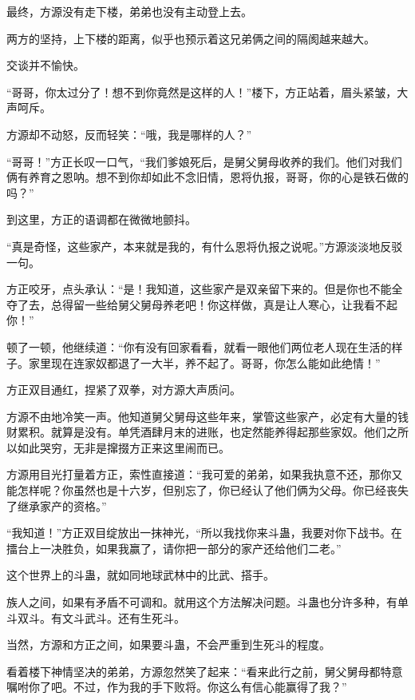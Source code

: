 
\begin{this_body}



最终，方源没有走下楼，弟弟也没有主动登上去。

两方的坚持，上下楼的距离，似乎也预示着这兄弟俩之间的隔阂越来越大。

交谈并不愉快。

“哥哥，你太过分了！想不到你竟然是这样的人！”楼下，方正站着，眉头紧皱，大声呵斥。

方源却不动怒，反而轻笑：“哦，我是哪样的人？”

“哥哥！”方正长叹一口气，“我们爹娘死后，是舅父舅母收养的我们。他们对我们俩有养育之恩呐。想不到你却如此不念旧情，恩将仇报，哥哥，你的心是铁石做的吗？”

到这里，方正的语调都在微微地颤抖。

“真是奇怪，这些家产，本来就是我的，有什么恩将仇报之说呢。”方源淡淡地反驳一句。

方正咬牙，点头承认：“是！我知道，这些家产是双亲留下来的。但是你也不能全夺了去，总得留一些给舅父舅母养老吧！你这样做，真是让人寒心，让我看不起你！”

顿了一顿，他继续道：“你有没有回家看看，就看一眼他们两位老人现在生活的样子。家里现在连家奴都退了一大半，养不起了。哥哥，你怎么能如此绝情！”

方正双目通红，捏紧了双拳，对方源大声质问。

方源不由地冷笑一声。他知道舅父舅母这些年来，掌管这些家产，必定有大量的钱财累积。就算是没有。单凭酒肆月末的进账，也定然能养得起那些家奴。他们之所以如此哭穷，无非是撺掇方正来这里闹而已。

方源用目光打量着方正，索性直接道：“我可爱的弟弟，如果我执意不还，那你又能怎样呢？你虽然也是十六岁，但别忘了，你已经认了他们俩为父母。你已经丧失了继承家产的资格。”

“我知道！”方正双目绽放出一抹神光，“所以我找你来斗蛊，我要对你下战书。在擂台上一决胜负，如果我赢了，请你把一部分的家产还给他们二老。”

这个世界上的斗蛊，就如同地球武林中的比武、搭手。

族人之间，如果有矛盾不可调和。就用这个方法解决问题。斗蛊也分许多种，有单斗双斗。有文斗武斗。还有生死斗。

当然，方源和方正之间，如果要斗蛊，不会严重到生死斗的程度。

看着楼下神情坚决的弟弟，方源忽然笑了起来：“看来此行之前，舅父舅母都特意嘱咐你了吧。不过，作为我的手下败将。你这么有信心能赢得了我？”


\end{this_body}
